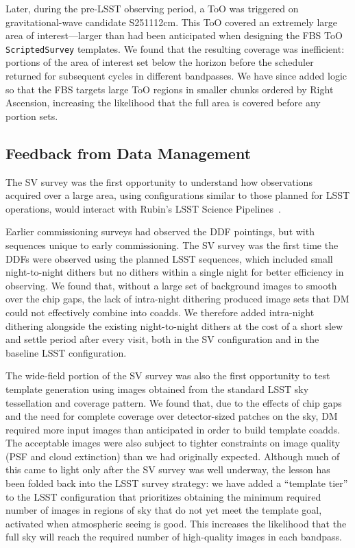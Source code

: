Later, during the pre-LSST observing period, a ToO was triggered on
gravitational-wave candidate S251112cm. This ToO covered an extremely large area
of interest---larger than had been anticipated when designing the FBS ToO
\texttt{ScriptedSurvey} templates. We found that the resulting coverage was
inefficient: portions of the area of interest set below the horizon before the
scheduler returned for subsequent cycles in different bandpasses. We have since
added logic so that the FBS targets large ToO regions in smaller chunks ordered
by Right Ascension, increasing the likelihood that the full area is covered before any portion
sets.

\subsection{Feedback from Data Management}

The SV survey was the first opportunity to understand how observations acquired
over a large area, using configurations similar to those planned for LSST
operations, would interact with Rubin's LSST Science Pipelines~\cite{PSTN-019}.

Earlier commissioning surveys had observed the DDF pointings, but with sequences
unique to early commissioning. The SV survey was the first time the DDFs
were observed using the planned LSST sequences, which included small night-to-night dithers
but no dithers within a single night for better efficiency in observing. We found that, without
a large set of background images to smooth over the chip gaps, the lack of
intra-night dithering produced image sets that DM could not effectively combine
into coadds. We therefore added intra-night dithering alongside the existing
night-to-night dithers at the cost of a short slew and settle period after every visit, 
both in the SV configuration and in the baseline LSST configuration.

The wide-field portion of the SV survey was also the first opportunity to test
template generation using images obtained from the standard LSST sky
tessellation and coverage pattern. We found that, due to the effects of chip
gaps and the need for complete coverage over detector-sized patches on the sky,
DM required more input images than anticipated in order to build template
coadds. The acceptable images were also subject to tighter constraints on image
quality (PSF and cloud extinction) than we had originally expected. Although
much of this came to light only after the SV survey was well underway, the
lesson has been folded back into the LSST survey strategy: we have added a
``template tier'' to the LSST configuration that prioritizes obtaining the
minimum required number of images in regions of sky that do not yet meet the
template goal, activated when atmospheric seeing is good. This increases the
likelihood that the full sky will reach the required number of high-quality
images in each bandpass.

